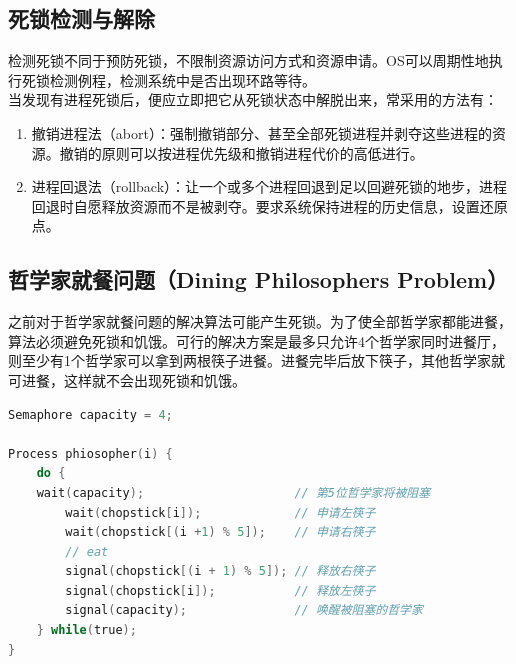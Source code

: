 \subsection{死锁检测与解除}

检测死锁不同于预防死锁，不限制资源访问方式和资源申请。OS可以周期性地执行死锁检测例程，检测系统中是否出现环路等待。\\

当发现有进程死锁后，便应立即把它从死锁状态中解脱出来，常采用的方法有：

\begin{enumerate}
    \item 撤销进程法（abort）：强制撤销部分、甚至全部死锁进程并剥夺这些进程的资源。撤销的原则可以按进程优先级和撤销进程代价的高低进行。

    \item 进程回退法（rollback）：让一个或多个进程回退到足以回避死锁的地步，进程回退时自愿释放资源而不是被剥夺。要求系统保持进程的历史信息，设置还原点。
\end{enumerate}

\vspace{0.5cm}

\subsection{哲学家就餐问题（Dining Philosophers Problem）}

之前对于哲学家就餐问题的解决算法可能产生死锁。为了使全部哲学家都能进餐，算法必须避免死锁和饥饿。可行的解决方案是最多只允许4个哲学家同时进餐厅，则至少有1个哲学家可以拿到两根筷子进餐。进餐完毕后放下筷子，其他哲学家就可进餐，这样就不会出现死锁和饥饿。\\


\begin{lstlisting}[language=C]
Semaphore capacity = 4;

Process phiosopher(i) {
	do {
	wait(capacity);						// 第5位哲学家将被阻塞
		wait(chopstick[i]);				// 申请左筷子
		wait(chopstick[(i +1) % 5]);	// 申请右筷子
		// eat
		signal(chopstick[(i + 1) % 5]);	// 释放右筷子
		signal(chopstick[i]);			// 释放左筷子
		signal(capacity);				// 唤醒被阻塞的哲学家
	} while(true);
}
\end{lstlisting}

\newpage